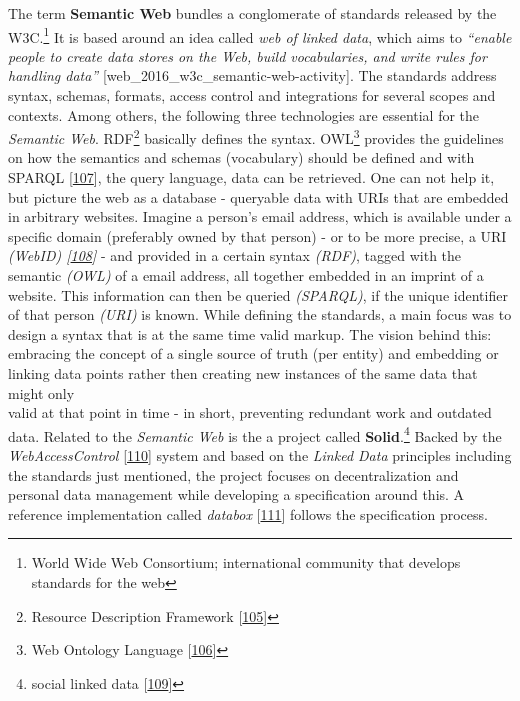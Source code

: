 \documentclass[12pt,english,a4paper,titlepage,cleardoublepage=empty,dottedtoc]{report}
\begin{document}
The term \textbf{\protect\hypertarget{link-semantic-web}{}{Semantic
Web}} bundles a conglomerate of standards released by the W3C.\footnote{World
  Wide Web Consortium; international community that develops standards
  for the web} It is based around an idea called \emph{web of linked
data}, which aims to \emph{``enable people to create data stores on the
Web, build vocabularies, and write rules for handling data''}
{[}web\_2016\_w3c\_semantic-web-activity{]}. The standards address
syntax, schemas, formats, access control and integrations for several
scopes and contexts. Among others, the following three technologies are
essential for the \emph{Semantic Web}. RDF\footnote{Resource Description
  Framework {[}\protect\hyperlink{ref-web_w3c-tr_rdf}{105}{]}} basically
defines the syntax. OWL\footnote{Web Ontology Language
  {[}\protect\hyperlink{ref-web_w3c-tr_owl}{106}{]}} provides the
guidelines on how the semantics and schemas (vocabulary) should be
defined and with \protect\hypertarget{link-sparql}{}{SPARQL}
{[}\protect\hyperlink{ref-web_w3c-tr_sparql}{107}{]}, the query
language, data can be retrieved. One can not help it, but picture the
web as a database - queryable data with URIs that are embedded in
arbitrary websites. Imagine a person's email address, which is available
under a specific domain (preferably owned by that person) - or to be
more precise, a URI \emph{(WebID)
{[}\protect\hyperlink{ref-web_w3c-draft_webid}{108}{]}} - and provided
in a certain syntax \emph{(RDF)}, tagged with the semantic \emph{(OWL)}
of a email address, all together embedded in an imprint of a website.
This information can then be queried \emph{(SPARQL)}, if the unique
identifier of that person \emph{(URI)} is known. While defining the
standards, a main focus was to design a syntax that is at the same time
valid markup. The vision behind this: embracing the concept of a single
source of truth (per entity) and embedding or linking data points rather
then creating new instances of the same data that might only\\
valid at that point in time - in short, preventing redundant work and
outdated data. Related to the \emph{Semantic Web} is the a project
called \textbf{Solid}.\footnote{social linked data
  {[}\protect\hyperlink{ref-web_spec_solid}{109}{]}} Backed by the
\emph{WebAccessControl}
{[}\protect\hyperlink{ref-web_2016_wiki_webaccesscontrol}{110}{]} system
and based on the \emph{Linked Data} principles including the standards
just mentioned, the project focuses on decentralization and personal
data management while developing a specification around this. A
reference implementation called \emph{databox}
{[}\protect\hyperlink{ref-web_2016_demo_databox}{111}{]} follows the
specification process.
\end{document}

